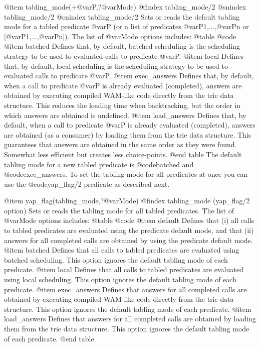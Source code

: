{{{{{{{{{@item tabling_mode(+@var{P},?@var{Mode})
@findex tabling_mode/2
@snindex tabling_mode/2
@cnindex tabling_mode/2
Sets or reads the default tabling mode for a tabled predicate @var{P}
(or a list of predicates @var{P1},...,@var{Pn} or
[@var{P1},...,@var{Pn}]). The list of @var{Mode} options includes:
@table @code
@item batched
      Defines that, by default, batched scheduling is the scheduling
      strategy to be used to evaluated calls to predicate @var{P}.
@item local
      Defines that, by default, local scheduling is the scheduling
      strategy to be used to evaluated calls to predicate @var{P}.
@item exec_answers
      Defines that, by default, when a call to predicate @var{P} is
      already evaluated (completed), answers are obtained by executing
      compiled WAM-like code directly from the trie data
      structure. This reduces the loading time when backtracking, but
      the order in which answers are obtained is undefined.
@item load_answers
      Defines that, by default, when a call to predicate @var{P} is
      already evaluated (completed), answers are obtained (as a
      consumer) by loading them from the trie data structure. This
      guarantees that answers are obtained in the same order as they
      were found. Somewhat less efficient but creates less choice-points.
@end table
The default tabling mode for a new tabled predicate is @code{batched}
and @code{exec_answers}. To set the tabling mode for all predicates at
once you can use the @code{yap_flag/2} predicate as described next.

@item yap_flag(tabling_mode,?@var{Mode})
@findex tabling_mode (yap_flag/2 option)
Sets or reads the tabling mode for all tabled predicates. The list of
@var{Mode} options includes:
@table @code
@item default
      Defines that (i) all calls to tabled predicates are evaluated
      using the predicate default mode, and that (ii) answers for all
      completed calls are obtained by using the predicate default mode.
@item batched
      Defines that all calls to tabled predicates are evaluated using
      batched scheduling. This option ignores the default tabling mode
      of each predicate.
@item local
      Defines that all calls to tabled predicates are evaluated using
      local scheduling. This option ignores the default tabling mode
      of each predicate.
@item exec_answers
      Defines that answers for all completed calls are obtained by
      executing compiled WAM-like code directly from the trie data
      structure. This option ignores the default tabling mode
      of each predicate.
@item load_answers
      Defines that answers for all completed calls are obtained by
      loading them from the trie data structure. This option ignores
      the default tabling mode of each predicate.
@end table

}}}}}}}}}
